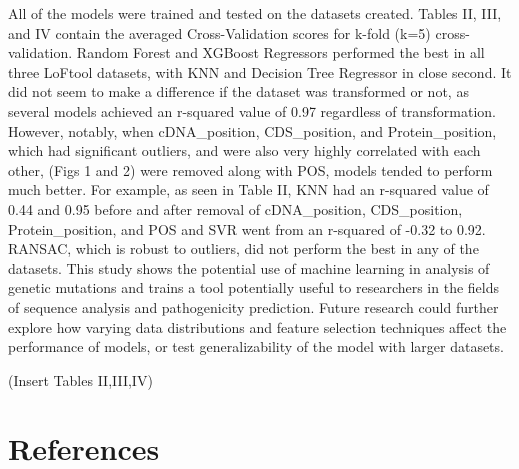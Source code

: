 \documentclass[journal,two side,web]{ieeecolor}
\begin{document}
All of the models were trained and tested on the datasets created. Tables II, III, and IV contain the averaged Cross-Validation scores for k-fold (k=5) cross-validation. Random Forest and XGBoost Regressors performed the best in all three LoFtool datasets, with KNN and Decision Tree Regressor in close second. It did not seem to make a difference if the dataset was transformed or not, as several models achieved an r-squared value of 0.97 regardless of transformation. However, notably, when cDNA\_position, CDS\_position, and Protein\_position, which had significant outliers, and were also very highly correlated with each other, (Figs 1 and 2) were removed along with POS, models tended to perform much better. For example, as seen in Table II, KNN had an r-squared value of 0.44 and 0.95 before and after removal of cDNA\_position, CDS\_position, Protein\_position, and POS and SVR went from an r-squared of -0.32 to 0.92. RANSAC, which is robust to outliers, did not perform the best in any of the datasets. This study shows the potential use of machine learning in analysis of genetic mutations and trains a tool potentially useful to researchers in the fields of sequence analysis and pathogenicity prediction. Future research could further explore how varying data distributions and feature selection techniques affect the performance of models, or test generalizability of the model with larger datasets. 

(Insert Tables II,III,IV)

\section*{References}

 
\end{document}
